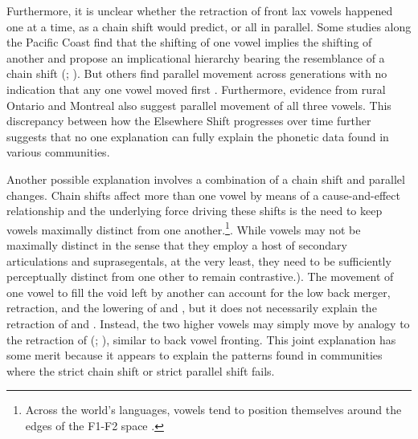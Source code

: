 Furthermore, it is unclear whether the retraction of front lax vowels happened one at a time, as a chain shift would predict, or all in parallel. Some studies along the Pacific Coast find that the shifting of one vowel implies the shifting of another and propose an implicational hierarchy bearing the resemblance of a chain shift (\citealt[116--117]{becker_etal_2016_pads}; \citealt[121]{holland_2014_diss}). But others find parallel movement across generations with no indication that any one vowel moved first \citep{pratt_etal_2018, donofrio_etal_2019}. Furthermore, evidence from rural Ontario \citep{lawrance_2002_thesis} and Montreal \citep{boberg_2005} also suggest parallel movement of all three vowels. This discrepancy between how the Elsewhere Shift progresses over time further suggests that no one explanation can fully explain the phonetic data found in various communities.

Another possible explanation involves a combination of a chain shift and parallel changes. Chain shifts affect more than one vowel by means of a cause-and-effect relationship \citep[119--121]{labov_1994} and the underlying force driving these shifts is the need to keep vowels maximally distinct from one another.\footnote{Across the world's languages, vowels tend to position themselves around the edges of the F1-F2 space \citep[228,285]{ladefoged_johnson_2011}.}. While vowels may not be maximally distinct in the sense that they employ a host of secondary articulations and suprasegentals, at the very least, they need to be sufficiently perceptually distinct from one other to remain contrastive.). The movement of one vowel to fill the void left by another can account for the low back merger, \trap retraction, and the lowering of \dress and \kit, but it does not necessarily explain the retraction of \dress and \kit. Instead, the two higher vowels may simply move by analogy to the retraction of \trap (\citealt[232]{durian_2012_diss}; \citealt[151]{boberg_2005}), similar to back vowel fronting. This joint explanation has some merit because it appears to explain the patterns found in communities where the strict chain shift or strict parallel shift fails.

